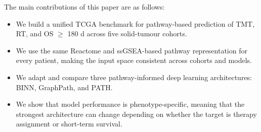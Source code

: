 The main contributions of this paper are as follows:
\begin{itemize}[leftmargin=*]
  \item We build a unified TCGA benchmark for pathway-based prediction of
  TMT, RT, and OS $\geq$ 180 d across five solid-tumour cohorts.
  \item We use the same Reactome and ssGSEA-based pathway representation for
  every patient, making the input space consistent across cohorts and models.
  \item We adapt and compare three pathway-informed deep learning
  architectures: BINN, GraphPath, and PATH.
  \item We show that model performance is phenotype-specific, meaning that
  the strongest architecture can change depending on whether the target is
  therapy assignment or short-term survival.
\end{itemize}
